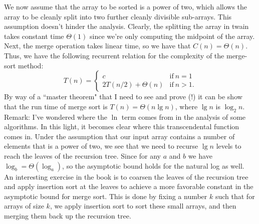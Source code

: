 \documentclass[12pt,english]{article}
\begin{document}
We now assume that the array to be sorted is a power of two, which allows the array to be cleanly split into two further cleanly divisible sub-arrays.  This assumption doesn't hinder the analysis.  Clearly, the splitting the array in twain takes constant time $\Theta(1)$ since we're only computing the midpoint of the array.  Next, the merge operation takes linear time, so we have that $C(n) = \Theta(n)$.  Thus, we have the following recurrent relation for the complexity of the merge-sort method:
$$
T(n) = 
\left\{
\begin{array}{cc}
c				& 	\text{if}~n=1 \\
2T(n/2) + \Theta(n)	&	\text{if}~n>1.
\end{array}
\right.
$$
By way of a ``master theorem" that I need to see and prove (!) it can be show that the run time of merge sort is $T(n) = \Theta(n \lg n)$, where $\lg n$ is $\log_2 n$.  Remark: I've wondered where the $\ln$ term comes from in the analysis of some algorithms.  In this light, it becomes clear where this transcendental function comes in.   Under the assumption that our input array contains a number of elements that is a power of two, we see that we need to recurse $\lg n$ levels to reach the leaves of the recursion tree.  Since for any $a$ and $b$ we have $\log_b = \Theta(\log_a)$, so the asymptotic bound holds for the natural log as well.  \\

An interesting exercise in the book is to coarsen the leaves of the recursion tree and apply insertion sort at the leaves to achieve a more favorable constant in the asymptotic bound for merge sort.  This is done by fixing a number $k$ such that for arrays of size $k$, we apply insertion sort to sort these small arrays, and then merging them back up the recursion tree.

{}

\end{document}
